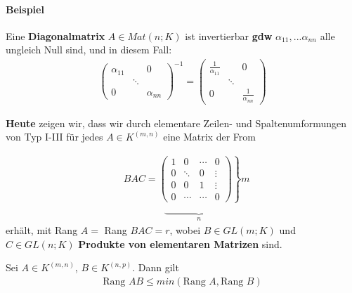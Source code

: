 \documentclass[11pt]{report}
\newcommand*\f[1] {\textbf{#1}}
\begin{document}

\paragraph{Beispiel}
Eine \f{Diagonalmatrix} $A \in  Mat(n;K)$ ist invertierbar \f{gdw} $\alpha_{11}, ... \alpha_{nn}$ alle ungleich Null sind, und in diesem Fall:
\begin{align}
\begin{pmatrix} \alpha_{11} & & 0 \\ & \ddots & \\ 0 & & \alpha_{nn} \end{pmatrix}^{-1} = \begin{pmatrix} \frac{1}{\alpha_{11}} & & 0 \\ & \ddots & \\ 0 & & \frac{1}{\alpha_{nn}} \end{pmatrix}
\end{align}

\f{Heute} zeigen wir, dass wir durch elementare Zeilen- und Spaltenumformungen von Typ I-III für jedes $A \in K^{(m,n)}$ eine Matrix der From

\begin{align}
& 
BAC =
\left.\begin{pmatrix} 	1 & 0 & \cdots & 0 \\ 
			0 & \ddots & 0 & \vdots \\ 
			0 & 0 & 1 & \vdots \\ 
			0 & \cdots & \cdots & 0
\end{pmatrix} \right\} m\\[-5pt]
& \quad\quad\quad\,\quad \underbrace{\phantom{mmmmmmmm}}_{n}
\end{align}
erhält, mit Rang $A =$ Rang $BAC = r$, wobei $B \in GL(m;K)$ und $C \in GL(n;K)$ \f{Produkte von elementaren Matrizen} sind.

\begin{lemma}
\label{lemma535}
Sei $A \in K^{(m,n)}$, $B \in K^{(n,p)}$. Dann gilt
\begin{align}
\text{Rang } AB \leq min(\text{Rang } A, \text{Rang } B)
\end{align}
\end{lemma}
\end{document}
